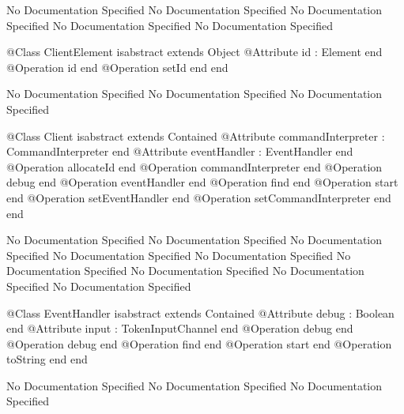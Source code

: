 No Documentation Specified
No Documentation Specified
No Documentation Specified
No Documentation Specified
No Documentation Specified
\begin{Interface}
@Class ClientElement isabstract extends Object
  @Attribute id : Element end
  @Operation id end
  @Operation setId end
end
\end{Interface}
No Documentation Specified
No Documentation Specified
No Documentation Specified
\begin{Interface}
@Class Client isabstract extends Contained
  @Attribute commandInterpreter : CommandInterpreter end
  @Attribute eventHandler : EventHandler end
  @Operation allocateId end
  @Operation commandInterpreter end
  @Operation debug end
  @Operation eventHandler end
  @Operation find end
  @Operation start end
  @Operation setEventHandler end
  @Operation setCommandInterpreter end
end
\end{Interface}
No Documentation Specified
No Documentation Specified
No Documentation Specified
No Documentation Specified
No Documentation Specified
No Documentation Specified
No Documentation Specified
No Documentation Specified
No Documentation Specified
\begin{Interface}
@Class EventHandler isabstract extends Contained
  @Attribute debug : Boolean end
  @Attribute input : TokenInputChannel end
  @Operation debug end
  @Operation debug end
  @Operation find end
  @Operation start end
  @Operation toString end
end
\end{Interface}
No Documentation Specified
No Documentation Specified
No Documentation Specified
